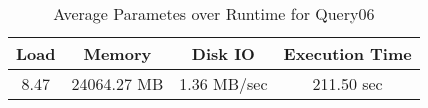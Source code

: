 \documentclass[../../main.tex]{subfiles}
\begin{document}
    \begin{table}
        \begin{center}
            \begin{tabular}{ |c|c|c|c| } 
            \hline
            Load & Memory & Disk IO & Execution Time\\
            \hline
            8.47 & 24064.27 MB & 1.36 MB/sec & 211.50 sec \\
            \hline
            \end{tabular}
            \\[1pt]
            \caption{Average Parametes over Runtime for Query06}
        \end{center}
    \end{table}
    \pagebreak
\end{document}

